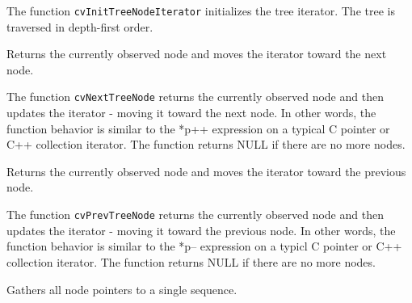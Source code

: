 The function \texttt{cvInitTreeNodeIterator} initializes the tree iterator. The tree is traversed in depth-first order.

\label{NextTreeNode}

Returns the currently observed node and moves the iterator toward the next node.


\begin{description}
\end{description}


The function \texttt{cvNextTreeNode} returns the currently observed node and then updates the iterator - moving it toward the next node. In other words, the function behavior is similar to the *p++ expression on a typical C pointer or C++ collection iterator. The function returns NULL if there are no more nodes.


\label{PrevTreeNode}

Returns the currently observed node and moves the iterator toward the previous node.


\begin{description}
\end{description}


The function \texttt{cvPrevTreeNode} returns the currently observed node and then updates the iterator - moving it toward the previous node. In other words, the function behavior is similar to the *p-- expression on a typicl C pointer or C++ collection iterator. The function returns NULL if there are no more nodes.


\label{TreeToNodeSeq}

Gathers all node pointers to a single sequence.


